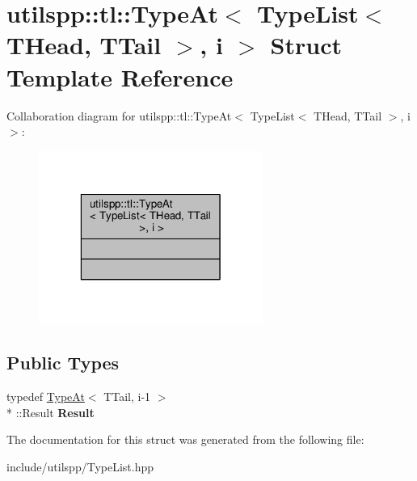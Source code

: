 \hypertarget{structutilspp_1_1tl_1_1TypeAt_3_01TypeList_3_01THead_00_01TTail_01_4_00_01i_01_4}{\section{utilspp\-:\-:tl\-:\-:Type\-At$<$ Type\-List$<$ T\-Head, T\-Tail $>$, i $>$ Struct Template Reference}
\label{structutilspp_1_1tl_1_1TypeAt_3_01TypeList_3_01THead_00_01TTail_01_4_00_01i_01_4}
}


Collaboration diagram for utilspp\-:\-:tl\-:\-:Type\-At$<$ Type\-List$<$ T\-Head, T\-Tail $>$, i $>$\-:
\nopagebreak
\begin{figure}[H]
\begin{center}
\leavevmode
\includegraphics[width=208pt]{structutilspp_1_1tl_1_1TypeAt_3_01TypeList_3_01THead_00_01TTail_01_4_00_01i_01_4__coll__graph}
\end{center}
\end{figure}
\subsection*{Public Types}
\begin{DoxyCompactItemize}
\item 
\hypertarget{structutilspp_1_1tl_1_1TypeAt_3_01TypeList_3_01THead_00_01TTail_01_4_00_01i_01_4_a813350563ebfa43ebd14c38df3fa1e1f}{typedef \hyperlink{structutilspp_1_1tl_1_1TypeAt}{Type\-At}$<$ T\-Tail, i-\/1 $>$\\*
\-::Result {\bfseries Result}}\label{structutilspp_1_1tl_1_1TypeAt_3_01TypeList_3_01THead_00_01TTail_01_4_00_01i_01_4_a813350563ebfa43ebd14c38df3fa1e1f}

\end{DoxyCompactItemize}


The documentation for this struct was generated from the following file\-:\begin{DoxyCompactItemize}
\item 
include/utilspp/Type\-List.\-hpp\end{DoxyCompactItemize}
